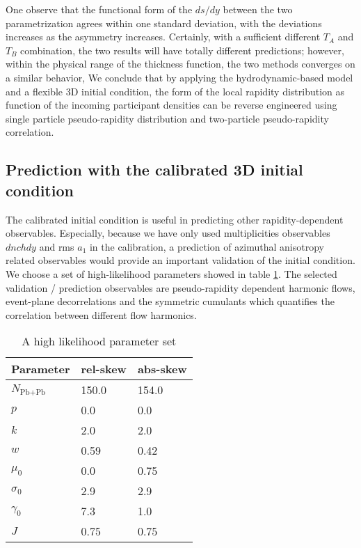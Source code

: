 One observe that the functional form of the $ds/dy$ between the two parametrization agrees within one standard deviation, with the deviations increases as the asymmetry increases.
Certainly, with a sufficient different $T_A$ and $T_B$ combination, the two results will have totally different predictions; however, within the physical range of the thickness function, the two methods converges on a similar behavior,
We conclude that by applying the hydrodynamic-based model and a flexible 3D initial condition, the form of the local rapidity distribution as function of the incoming participant densities can be reverse engineered using single particle pseudo-rapidity distribution and two-particle pseudo-rapidity correlation.

\subsection{Prediction with the calibrated 3D initial condition}
The calibrated initial condition is useful in predicting other rapidity-dependent observables.
Especially, because we have only used multiplicities observables $dnchdy$ and rms $a_1$ in the calibration, a prediction of azimuthal anisotropy related observables would provide an important validation of the initial condition.
We choose a set of high-likelihood parameters showed in table \ref{tab:chosen_parameters}.
The selected validation / prediction observables are pseudo-rapidity dependent harmonic flows, event-plane decorrelations and the symmetric cumulants which quantifies the correlation between different flow harmonics.

\begin{table}
\centering
\caption{A high likelihood parameter set}
\begin{tabular}{lll}
\hline
Parameter & rel-skew	& abs-skew \\
\hline
$N_{\textrm{Pb+Pb}}$   & 150.0     & 154.0  \\
$p$	    & 0.0      & 0.0  \\
$k$	    & 2.0     & 2.0  \\
$w$	    & 0.59     & 0.42  \\
$\mu_0$   & 0.0     & 0.75  \\
$\sigma_0$ & 2.9    & 2.9  \\
$\gamma_0$ & 7.3		& 1.0	\\
$J$	     & 0.75 & 0.75	\\
\hline
\end{tabular}
\label{tab:chosen_parameters}    
\end{table}

